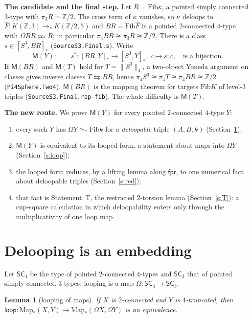 \documentclass[11pt]{amsart}
\newtheorem{lemma}[theorem]{Lemma}
\theoremstyle{definition}
\theoremstyle{remark}
\newcommand{\Om}{\Omega}
\newcommand{\Z}{\mathbb{Z}}
\newcommand{\code}[1]{\texttt{#1}}
\newcommand{\Map}{\mathrm{Map}_*}
\newcommand{\hc}[2]{[#1,#2]_*}
\newcommand{\Fib}{\mathrm{Fib}}
\newcommand{\fpr}{\mathsf{fpr}}
\newcommand{\tr}[1]{\|#1\|}
\newcommand{\kb}{\bar\kappa}
\newcommand{\lp}{\mathsf{loop}}
\newcommand{\SCt}{\mathsf{SC}_3}
\newcommand{\SCf}{\mathsf{SC}_4}
\newcommand{\pteq}{\simeq_*}
\begin{document}
\smallskip\noindent\textbf{The candidate and the final step.} Let $R=\Fib\kb$, a
pointed simply connected $3$-type with $\pi_3R=\Z/2$. The cross term of
$\kb$ vanishes, so $\kb$ deloops to $\hat F:K(\Z,3)\to_*K(\Z/2,5)$ and
$BR=\Fib\hat F$ is a pointed $2$-connected $4$-type with $\Om BR\pteq R$; in
particular $\pi_4BR\cong\pi_3R\cong\Z/2$. There is a class $s\in\hc{S^3}{BR}$
(\code{SourceS3.Final.s}). Write
\[
  \mathsf M(Y):\qquad s^*:\hc{BR}{Y}\to\hc{S^3}{Y},\ c\mapsto s;c,\quad\text{is a bijection.}
\]
If $\mathsf M(BR)$ and $\mathsf M(T)$ hold for $T=\tr{S^3}_4$, a two-object
Yoneda argument on classes gives inverse classes $T\leftrightarrows BR$, hence
$\pi_4S^3\cong\pi_4T\cong\pi_4BR\cong\Z/2$ (\code{Pi4Sphere.Two4}).
$\mathsf M(BR)$ is the mapping theorem for targets $\Fib K$ of level-$3$
triples (\code{SourceS3.Final.rep-fib}). The whole difficulty is $\mathsf M(T)$.

\smallskip\noindent\textbf{The new route.} We prove $\mathsf M(Y)$ for every
pointed $2$-connected $4$-type $Y$:
\begin{enumerate}
\item every such $Y$ has $\Om Y\pteq\Fib k$ for a \emph{deloopable} triple
$(A,B,k)$ (Section~\ref{s:emb});
\item $\mathsf M(Y)$ is equivalent to its looped form, a statement about maps
into $\Om Y$ (Section~\ref{s:loop});
\item the looped form reduces, by a lifting lemma along $\fpr$, to one
numerical fact about deloopable triples (Section~\ref{s:red});
\item that fact is Statement~T, the restricted $2$-torsion lemma
(Section~\ref{s:T}): a cup-square calculation in which deloopability enters only
through the multiplicativity of one loop map.
\end{enumerate}

\section{Delooping is an embedding}\label{s:emb}

Let $\SCf$ be the type of pointed $2$-connected $4$-types and $\SCt$ that of
pointed simply connected $3$-types; looping is a map $\Om:\SCf\to\SCt$.

\begin{lemma}[looping of maps]\label{lem:loop}
If $X$ is $2$-connected and $Y$ is $4$-truncated, then
$\lp:\Map(X,Y)\to\Map(\Om X,\Om Y)$ is an equivalence.
\end{lemma}
\end{document}
